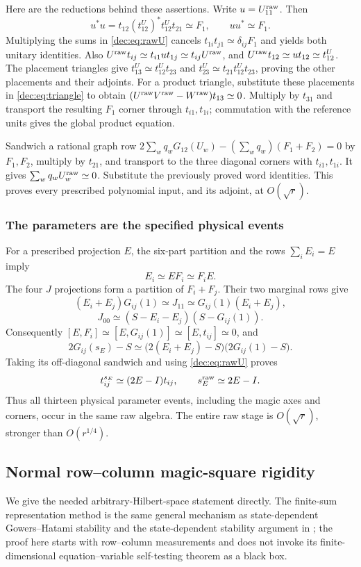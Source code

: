 Here are the reductions behind these assertions. Write $u=U_{11}^{\mathrm{raw}}$. Then
\[
u^*u=t_{12}(t_{12}^{U})^*t_{12}^{U}t_{21}\simeq F_1,
\qquad uu^*\simeq F_1.
\]
Multiplying the sums in \eqref{dec:eq:rawU} cancels $t_{1i}t_{j1}\simeq\delta_{ij}F_1$ and yields both unitary identities. Also
$U^{\mathrm{raw}}t_{ij}\simeq t_{i1}u t_{1j}\simeq t_{ij}U^{\mathrm{raw}}$, and
$U^{\mathrm{raw}}t_{12}\simeq u t_{12}\simeq t_{12}^{U}$.
The placement triangles give $t_{13}^{U}\simeq t_{12}^{U}t_{23}$ and
$t_{23}^{U}\simeq t_{21}t_{12}^{U}t_{23}$, proving the other placements and their adjoints. For a product triangle, substitute these placements in \eqref{dec:eq:triangle} to obtain
$(U^{\mathrm{raw}}V^{\mathrm{raw}}-W^{\mathrm{raw}})t_{13}\simeq0$. Multiply by $t_{31}$ and transport the resulting $F_1$ corner through $t_{i1},t_{1i}$; commutation with the reference units gives the global product equation.

Sandwich a rational graph row
$2\sum_wq_wG_{12}(U_w)-(\sum_wq_w)(F_1+F_2)=0$
by $F_1,F_2$, multiply by $t_{21}$, and transport to the three diagonal corners with $t_{i1},t_{1i}$. It gives $\sum_wq_wU_w^{\mathrm{raw}}\simeq0$. Substitute the previously proved word identities. This proves every prescribed polynomial input, and its adjoint, at $O(\sqrt r)$.

\subsubsection{The parameters are the specified physical events}
For a prescribed projection $E$, the six-part partition and the rows $\sum_iE_i=E$ imply
\[
E_i\simeq EF_i\simeq F_iE.
\]
The four $J$ projections form a partition of $F_i+F_j$. Their two marginal rows give
\[
(E_i+E_j)G_{ij}(1)\simeq J_{11}\simeq G_{ij}(1)(E_i+E_j),
\]
\[
J_{00}\simeq(S-E_i-E_j)(S-G_{ij}(1)).
\]
Consequently $[E,F_i]\simeq[E,G_{ij}(1)]\simeq[E,t_{ij}]\simeq0$, and
\[
2G_{ij}(s_E)-S\simeq
\bigl(2(E_i+E_j)-S\bigr)\bigl(2G_{ij}(1)-S\bigr).
\]
Taking its off-diagonal sandwich and using \eqref{dec:eq:rawU} proves
\begin{equation}\label{dec:eq:param}
t_{ij}^{s_E}\simeq(2E-I)t_{ij},\qquad
s_E^{\mathrm{raw}}\simeq2E-I.
\end{equation}
Thus all thirteen physical parameter events, including the magic axes and corners, occur in the same raw algebra. The entire raw stage is $O(\sqrt r)$, stronger than $O(r^{1/4})$.

\subsection{Normal row--column magic-square rigidity}\label{dec:sec:magic}
We give the needed arbitrary-Hilbert-space statement directly. The finite-sum representation method is the same general mechanism as state-dependent Gowers--Hatami stability \cite{VidickGH,GH} and the state-dependent stability argument in \cite[Lemma 4.7]{CSRigidity}; the proof here starts with row--column measurements and does not invoke its finite-dimensional equation--variable self-testing theorem as a black box.

